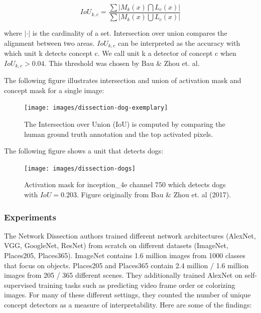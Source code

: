 \documentclass[
  12pt,
]{krantz}
\begin{document}
\[IoU_{k,c}=\frac{\sum|M_k(x)\bigcap{}L_c(x)|}{\sum|M_k(x)\bigcup{}L_c(x)|}\]

where \(|\cdot|\) is the cardinality of a set.
Intersection over union compares the alignment between two areas.
\(IoU_{k,c}\) can be interpreted as the accuracy with which unit k detects concept c.
We call unit k a detector of concept c when \(IoU_{k,c}>0.04\).
This threshold was chosen by Bau \& Zhou et. al.

The following figure illustrates intersection and union of activation mask and concept mask for a single image:

\begin{figure}

{\centering \texttt{[image: images/dissection-dog-exemplary]} 

}

\caption{The Intersection over Union (IoU) is computed by comparing the human ground truth annotation and the top activated pixels.}\label{fig:unnamed-chunk-56}
\end{figure}

The following figure shows a unit that detects dogs:

\begin{figure}

{\centering \texttt{[image: images/dissection-dogs]} 

}

\caption{Activation mask for inception\_4e channel 750 which detects dogs with $IoU=0.203$. Figure originally from Bau \& Zhou et. al (2017).}\label{fig:unnamed-chunk-57}
\end{figure}

\hypertarget{experiments}{%
\subsubsection{Experiments}\label{experiments}}

The Network Dissection authors trained different network architectures (AlexNet, VGG, GoogleNet, ResNet) from scratch on different datasets (ImageNet, Places205, Places365).
ImageNet contains 1.6 million images from 1000 classes that focus on objects.
Places205 and Places365 contain 2.4 million / 1.6 million images from 205 / 365 different scenes.
They additionally trained AlexNet on self-supervised training tasks such as predicting video frame order or colorizing images.
For many of these different settings, they counted the number of unique concept detectors as a measure of interpretability.
Here are some of the findings:
\end{document}
